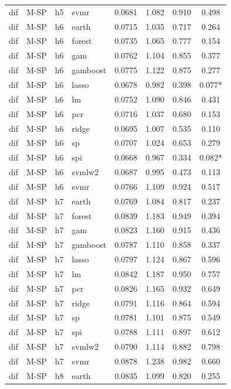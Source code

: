 \begin{ThreePartTable}
\begin{longtable}[t]{llclcccc}
dif & M-SP & h5 & svmr & 0.0681 & 1.082 & 0.910 & 0.498\\
\addlinespace
dif & M-SP & h6 & earth & 0.0715 & 1.035 & 0.717 & 0.264\\
dif & M-SP & h6 & forest & 0.0735 & 1.065 & 0.777 & 0.154\\
dif & M-SP & h6 & gam & 0.0762 & 1.104 & 0.855 & 0.377\\
dif & M-SP & h6 & gamboost & 0.0775 & 1.122 & 0.875 & 0.277\\
dif & M-SP & h6 & lasso & 0.0678 & 0.982 & 0.398 & 0.077*\\
dif & M-SP & h6 & lm & 0.0752 & 1.090 & 0.846 & 0.431\\
dif & M-SP & h6 & pcr & 0.0716 & 1.037 & 0.680 & 0.153\\
dif & M-SP & h6 & ridge & 0.0695 & 1.007 & 0.535 & 0.110\\
dif & M-SP & h6 & sp & 0.0707 & 1.024 & 0.653 & 0.279\\
dif & M-SP & h6 & spi & 0.0668 & 0.967 & 0.334 & 0.082*\\
dif & M-SP & h6 & svmlw2 & 0.0687 & 0.995 & 0.473 & 0.113\\
dif & M-SP & h6 & svmr & 0.0766 & 1.109 & 0.924 & 0.517\\
\addlinespace
dif & M-SP & h7 & earth & 0.0769 & 1.084 & 0.817 & 0.237\\
dif & M-SP & h7 & forest & 0.0839 & 1.183 & 0.949 & 0.394\\
dif & M-SP & h7 & gam & 0.0823 & 1.160 & 0.915 & 0.436\\
dif & M-SP & h7 & gamboost & 0.0787 & 1.110 & 0.858 & 0.337\\
dif & M-SP & h7 & lasso & 0.0797 & 1.124 & 0.867 & 0.596\\
dif & M-SP & h7 & lm & 0.0842 & 1.187 & 0.950 & 0.757\\
dif & M-SP & h7 & pcr & 0.0826 & 1.165 & 0.932 & 0.649\\
dif & M-SP & h7 & ridge & 0.0791 & 1.116 & 0.864 & 0.594\\
dif & M-SP & h7 & sp & 0.0781 & 1.101 & 0.875 & 0.549\\
dif & M-SP & h7 & spi & 0.0788 & 1.111 & 0.897 & 0.612\\
dif & M-SP & h7 & svmlw2 & 0.0790 & 1.114 & 0.882 & 0.798\\
dif & M-SP & h7 & svmr & 0.0878 & 1.238 & 0.982 & 0.660\\
\addlinespace
dif & M-SP & h8 & earth & 0.0835 & 1.099 & 0.820 & 0.255\\

\end{longtable}
\end{ThreePartTable}
